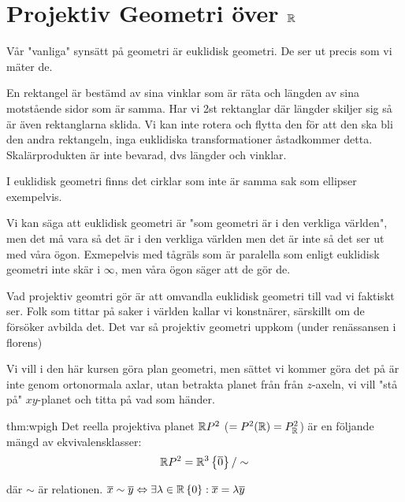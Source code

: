 \section{Projektiv Geometri över $\mathbb{R}$}\par
\noindent Vår "vanliga" synsätt på geometri är euklidisk geometri. De ser ut precis som vi mäter de.
\par\bigskip
\noindent En rektangel är bestämd av sina vinklar som är räta och längden av sina motstående sidor som är samma. Har vi 2st rektanglar där längder skiljer sig så är även rektanglarna sklida. Vi kan inte rotera och flytta den för att den ska bli den andra rektangeln, inga euklidiska transformationer åstadkommer detta. Skalärprodukten är inte bevarad, dvs längder och vinklar.
\par\bigskip
\noindent I euklidisk geometri finns det cirklar som inte är samma sak som ellipser exempelvis.
\par\bigskip
\noindent Vi kan säga att euklidisk geometri är "som geometri är i den verkliga världen", men det må vara så det är i den verkliga världen men det är inte så det ser ut med våra ögon. Exmepelvis med tågräls som är paralella som enligt euklidisk geometri inte skär i $\infty$, men våra ögon säger att de gör de.
\par\bigskip
\noindent Vad projektiv geomtri gör är att omvandla euklidisk geometri till vad vi faktiskt ser. Folk som tittar på saker i världen kallar vi konstnärer, särskillt om de försöker avbilda det. Det var så projektiv geometri uppkom (under renässansen i florens)
\par\bigskip
\noindent Vi vill i den här kursen göra plan geometri, men sättet vi kommer göra det på är inte genom ortonormala axlar, utan betrakta planet från från $z$-axeln, vi vill "stå på" $xy$-planet och titta på vad som händer.
\par\bigskip
\begin{theo}{thm:wpigh}
  Det reella projektiva planet $\mathbb{R} P^2$ ($= P^2(\mathbb{R}) = P_{\mathbb{R}}^2$) är en följande mängd av ekvivalensklasser:
  \begin{equation*}
    \begin{gathered}
      \mathbb{R} P^2 = \mathbb{R}^3\left\{\overline{0}\right\}/\sim
    \end{gathered}
  \end{equation*}\par
  \noindent där $\sim$ är relationen. $\overline{x}\sim\overline{y}\Leftrightarrow\exists\lambda\in\mathbb{R} \left\{0\right\}: \overline{x}=\lambda\overline{y}$
\end{theo}
